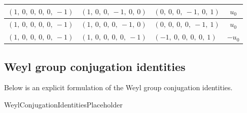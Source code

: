 \documentclass[11pt]{article}
\newcommand{\noi}{\noindent}
\theoremstyle{definition}
\begin{document}
\begin{longtable}{|l|l|l|c|}
    \hline
    $\left( 1, \  0, \  0, \  0, \  0, \  -1\right)$ & $\left( 1, \  0, \  0, \  -1, \  0, \  0\right)$ & $\left( 0, \  0, \  0, \  -1, \  0, \  1\right)$ & $u_{0}$ \\
    \hline
    $\left( 1, \  0, \  0, \  0, \  0, \  -1\right)$ & $\left( 1, \  0, \  0, \  0, \  -1, \  0\right)$ & $\left( 0, \  0, \  0, \  0, \  -1, \  1\right)$ & $u_{0}$ \\
    \hline
    $\left( 1, \  0, \  0, \  0, \  0, \  -1\right)$ & $\left( 1, \  0, \  0, \  0, \  0, \  -1\right)$ & $\left( -1, \  0, \  0, \  0, \  0, \  1\right)$ & $- u_{0}$ \\
    \hline
\end{longtable}


\subsection{Weyl group conjugation identities}

\noi Below is an explicit formulation of the Weyl group conjugation identities.

\bigskip

\noi WeylConjugationIdentitiesPlaceholder
\end{document}
